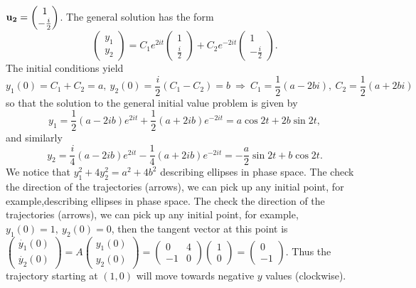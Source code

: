 \documentclass[11pt,a4paper]{article}
\begin{document}
	$
	\vb{u_2}
	=
	\begin{pmatrix}
		1\\
		-\frac{i}{2}
	\end{pmatrix}
	$.
	The general solution has the form
	$$
	\begin{pmatrix}
		y_1\\
		y_2
	\end{pmatrix}
	= C_1e^{2it}
	\begin{pmatrix}
		1\\
		\frac{i}{2}
	\end{pmatrix}
	+ C_2e^{-2it}
	\begin{pmatrix}
		1\\
		-\frac{i}{2}
	\end{pmatrix}.
	$$
	The initial conditions yield
	$$
	y_1(0) = C_1 + C_2 = a,\ y_2(0) = \frac{i}{2}(C_1-C_2)=b\ \Rightarrow\ C_1 = \frac{1}{2}(a-2bi),\ C_2 = \frac{1}{2}(a+2bi)
	$$
	so that the solution to the general initial value problem is given by
	$$
	y_1 = \frac{1}{2}(a-2ib)e^{2it} + \frac{1}{2}(a+2ib)e^{-2it} = a\cos 2t+2b\sin 2t,
	$$
	and similarly
	$$
	y_2 = \frac{i}{4}(a-2ib)e^{2it} - \frac{1}{4}(a+2ib)e^{-2it} = -\frac{a}{2}\sin 2t + b\cos 2t.
	$$
	We notice that $y_1^2 + 4y_2^2 = a^2 + 4b^2$ describing ellipses in phase space. The check the direction of the trajectories (arrows), we can pick up any initial point, for example,describing ellipses in phase space. The check the direction of the trajectories (arrows), we can pick up any initial point, for example, $y_1(0) = 1,\ y_2(0) = 0$, then the tangent vector at this point is
	$
	\begin{pmatrix}
		\dot{y_1}(0)\\
		\dot{y_2}(0)
	\end{pmatrix}
	=A
	\begin{pmatrix}
		y_1(0)\\
		y_2(0)
	\end{pmatrix}
	=
	\begin{pmatrix}
		0 & 4\\
		-1 & 0
	\end{pmatrix}
	\begin{pmatrix}
		1\\
		0
	\end{pmatrix}
	=
	\begin{pmatrix}
		0\\
		-1
	\end{pmatrix}
	$.
	Thus the trajectory starting at $(1, 0)$ will move towards negative $y$ values (clockwise).\\
\end{document}
